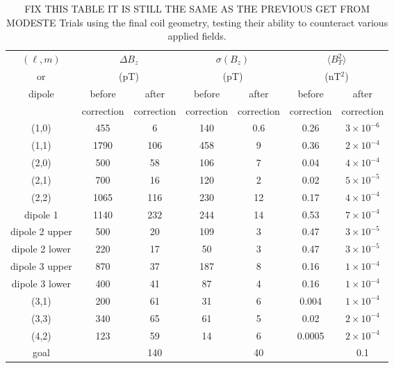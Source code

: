 \documentclass[preprint,12pt]{elsarticle}
\begin{document}
\begin{table}
  \begin{center}
    \begin{tabular}{ccccccc}
      $(\ell,m)$ & \multicolumn{2}{c}{$\Delta B_z$} & \multicolumn{2}{c}{$\sigma(B_z)$} & \multicolumn{2}{c}{$\langle B_T^2\rangle$}\\
      or &  \multicolumn{2}{c}{(pT)} & \multicolumn{2}{c}{(pT)} & \multicolumn{2}{c}{(nT$^2$)} \\\cline{2-7}
      dipole & before & after & before & after & before & after \\
      & correction & correction & correction & correction & correction & correction \\\hline
      (1,0) & 455 &  6 & 140 & 0.6 & 0.26 & $3\times 10^{-6}$ \\
      (1,1) &1790 &106 & 458 & 9 & 0.36 & $2\times 10^{-4}$ \\
      (2,0) & 500 & 58 & 106 & 7 & 0.04 & $4\times 10^{-4}$ \\
      (2,1) & 700 & 16 & 120 & 2 & 0.02 & $5\times 10^{-5}$ \\
      (2,2) &1065 &116 & 230 &12 & 0.17 & $4\times 10^{-4}$ \\
      dipole 1 &1140&$\boxed{232}$ & 244 &14 & 0.53 & $7\times 10^{-4}$ \\
      dipole 2 upper&500& 20 & 109 & 3 & 0.47 & $3\times 10^{-5}$ \\
      dipole 2 lower&220& 17 &  50 & 3 & 0.47 & $3\times 10^{-5}$ \\
      dipole 3 upper&870& 37 & 187 & 8 & 0.16 & $1\times 10^{-4}$ \\
      dipole 3 lower&400& 41 &  87 & 4 & 0.16 & $1\times 10^{-4}$ \\
      (3,1) & 200 & 61 &  31 & 6 & 0.004& $1\times 10^{-4}$ \\
      (3,3) & 340 & 65 &  61 & 5 & 0.02 & $2\times 10^{-4}$ \\
      (4,2) & 123 & 59 &  14 & 6 & 0.0005&$2\times 10^{-4}$ \\
      \hline
      goal & & 140 & & 40 & & 0.1 \\
    \end{tabular}
    \caption{FIX THIS TABLE IT IS STILL THE SAME AS THE PREVIOUS GET
      FROM MODESTE Trials using the final coil geometry, testing their
      ability to counteract various applied
      fields.\label{tab:modeste}}
  \end{center}
\end{table}
\end{document}
